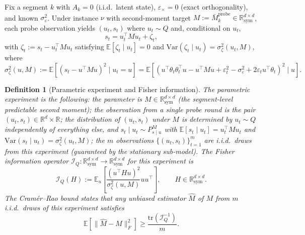 \documentclass[12pt]{article}
\newcommand{\R}{\mathbb{R}}
\newcommand{\E}{\mathbb{E}}
\newcommand{\Rsy}{\mathbb{R}^{d\times d}_{\mathrm{sym}}}
\newcommand{\tr}{\mathrm{tr}}
\newtheorem{definition}{Definition}
\theoremstyle{plain}
\theoremstyle{definition}
\begin{document}
Fix a segment $k$ with $A_k = 0$ (i.i.d.\ latent state), $\varepsilon_\times = 0$ (exact orthogonality), and known $\sigma_\varepsilon^2$. Under instance $\nu$ with second-moment target $M := \bar{M}_k^{\mathrm{probe}} \in \Rsy$, each probe observation yields $(u_t, s_t)$ where $u_t \sim Q$ and, conditional on $u_t$,
\[
s_t = u_t^\top M u_t + \zeta_t,
\]
with $\zeta_t := s_t - u_t^\top M u_t$ satisfying $\E[\zeta_t \mid u_t] = 0$ and $\mathrm{Var}(\zeta_t \mid u_t) = \sigma_\zeta^2(u_t, M)$, where
\begin{equation}
\sigma_\zeta^2(u, M) := \E[(s_t - u^\top M u)^2 \mid u_t = u]
= \E[(u^\top \theta_t \theta_t^\top u - u^\top M u + \varepsilon_t^2 - \sigma_\varepsilon^2 + 2\varepsilon_t u^\top\theta_t)^2 \mid u].
\label{eq:conditional_variance}
\end{equation}

\begin{definition}[Parametric experiment and Fisher information]
\label{def:fisher}
The \emph{parametric experiment} is the following: the parameter is $M \in \Rsy$ (the segment-level predictable second moment); the observation from a single probe round is the pair $(u_t, s_t) \in \R^d \times \R$; the distribution of $(u_t, s_t)$ under $M$ is determined by $u_t \sim Q$ independently of everything else, and $s_t \mid u_t \sim P_{s \mid u}^M$ with $\E[s_t \mid u_t] = u_t^\top M u_t$ and $\mathrm{Var}(s_t \mid u_t) = \sigma_\zeta^2(u_t, M)$; the $m$ observations $\{(u_t, s_t)\}_{t=1}^m$ are i.i.d.\ draws from this experiment (guaranteed by the stationary sub-model). The Fisher information operator $\mathcal{I}_Q : \Rsy \to \Rsy$ for this experiment is
\begin{equation}
\mathcal{I}_Q(H) := \E_u\!\left[\frac{(u^\top H u)^2}{\sigma_\zeta^2(u, M)} uu^\top\right], \qquad H \in \Rsy.
\label{eq:fisher_operator}
\end{equation}
The Cram\'er--Rao bound states that any unbiased estimator $\widehat{M}$ of $M$ from $m$ i.i.d.\ draws of this experiment satisfies
\begin{equation}
\E\!\left[\|\widehat{M} - M\|_F^2\right] \ge \frac{\tr(\mathcal{I}_Q^{-1})}{m}.
\label{eq:cramer_rao}
\end{equation}
\end{definition}
\end{document}
